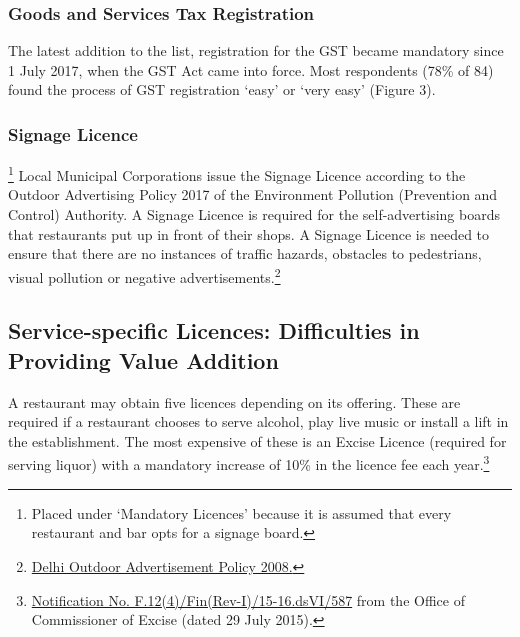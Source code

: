 \documentclass[a4paper, 12pt]{article}
\begin{document}

		\subsubsection{Goods and Services Tax Registration}
		The latest addition to the list, registration for the GST became mandatory since 1 July 2017, when the GST Act came into force. Most respondents (78\% of 84) found the process of GST registration ‘easy’ or ‘very easy’ (Figure 3).
		
		\subsubsection{Signage Licence}\footnote{Placed under ‘Mandatory Licences’ because it is assumed that every restaurant and bar opts for a signage board.}
		Local Municipal Corporations issue the Signage Licence according to the Outdoor Advertising Policy 2017 of the Environment Pollution (Prevention and Control) Authority. A Signage Licence is required for the self-advertising boards that restaurants put 
up in front of their shops. A Signage Licence is needed to ensure that there are no instances of traffic hazards, obstacles to pedestrians, visual pollution or negative advertisements.\footnote{\href{https://bit.ly/2xdiNzk}{Delhi Outdoor Advertisement Policy 2008.}}
		

		
		\subsection{Service-specific Licences: Difficulties in Providing Value Addition}
		
		
		A restaurant may obtain five licences depending on its offering. These are required if a restaurant chooses to serve alcohol, play live music or install a lift in the establishment. The most expensive of these is an Excise Licence (required for serving liquor) 
with a mandatory increase of 10\% in the licence fee each year.\footnote{\href{https://bit.ly/2xoejoG}{Notification No. F.12(4)/Fin(Rev-I)/15-16.dsVI/587} from the Office of Commissioner of Excise (dated 29 July 2015).}
		
		
\end{document}
